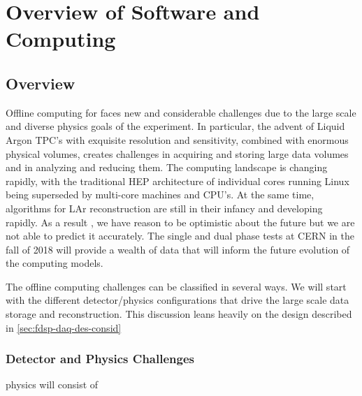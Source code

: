 %
\chapter{Overview of Software and Computing }


\section{Overview}

Offline computing for   faces new and considerable challenges due to the large scale and diverse physics goals of the experiment.  In particular, the advent of Liquid Argon TPC's with exquisite resolution and sensitivity, combined with enormous physical volumes, creates challenges in acquiring and storing large data volumes and in analyzing and reducing them.  The computing landscape is changing rapidly, with the traditional HEP architecture of individual cores running Linux being superseded by multi-core machines and CPU's. At the same time, algorithms for LAr reconstruction are still in their infancy and developing rapidly.  As a result , we have reason to be optimistic about the future but we are not able to predict it accurately.  The  single and dual phase tests at CERN in the fall of 2018 will provide a wealth of data that will inform the future evolution of  the  computing models.

The   offline computing challenges can be classified in several ways.  We will start with the different detector/physics configurations that drive the large scale data storage and reconstruction. 
This discussion leans heavily on the  design described in \ref{sec:fdsp-daq-des-consid}


\subsection{Detector and Physics Challenges}

  physics will consist of 

